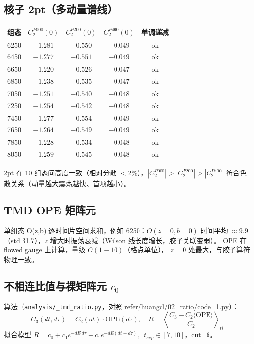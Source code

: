 \documentclass[11pt]{article}
\begin{document}
\subsection{核子 2pt（多动量谱线）}
\begin{center}
\begin{tabular}{lccccc}
\hline
组态 & $C_2^{P000}(0)$ & $C_2^{P200}(0)$ & $C_2^{P400}(0)$ & 单调递减 \\
\hline
6250 & $-1.281$ & $-0.550$ & $-0.049$ & ok \\
6450 & $-1.277$ & $-0.551$ & $-0.049$ & ok \\
6650 & $-1.220$ & $-0.526$ & $-0.047$ & ok \\
6850 & $-1.238$ & $-0.535$ & $-0.047$ & ok \\
7050 & $-1.251$ & $-0.540$ & $-0.048$ & ok \\
7250 & $-1.254$ & $-0.542$ & $-0.048$ & ok \\
7450 & $-1.277$ & $-0.554$ & $-0.049$ & ok \\
7650 & $-1.264$ & $-0.549$ & $-0.049$ & ok \\
7850 & $-1.228$ & $-0.534$ & $-0.048$ & ok \\
8050 & $-1.259$ & $-0.545$ & $-0.048$ & ok \\
\hline
\end{tabular}
\end{center}
2pt 在 10 组态间高度一致（相对分散 $<2\%$），$|C_2^{P000}|>|C_2^{P200}|>|C_2^{P400}|$
符合色散关系（动量越大震荡越快、首项越小）。

\subsection{TMD OPE 矩阵元}
单组态 O(z,b) 逐时间片空间求和，例如 6250：$O(z{=}0,b{=}0)$ 时间平均 $\approx 9.9$
（std 31.7），$z$ 增大时振荡衰减（Wilson 线长度增长，胶子关联变弱）。
OPE 在 flowed gauge 上计算，量级 $O(1{-}10)$（格点单位），
$z{=}0$ 处最大，与胶子算符物理一致。

\subsection{不相连比值与裸矩阵元 $c_0$}
算法（\texttt{analysis/\_tmd\_ratio.py}，对照 refer/huangcl/02\_ratio/code\_1.py）：
\[
C_3(dt,d\tau)=C_2(dt)\cdot \mathrm{OPE}(d\tau),\quad
R=\left\langle\frac{C_3-C_2\langle\mathrm{OPE}\rangle}{C_2}\right\rangle_{ti}
\]
拟合模型 $R=c_0+c_1 e^{-dE\,d\tau}+c_1 e^{-dE(dt-d\tau)}$，$t_{sep}\in[7,10]$，cut=6。
\end{document}
